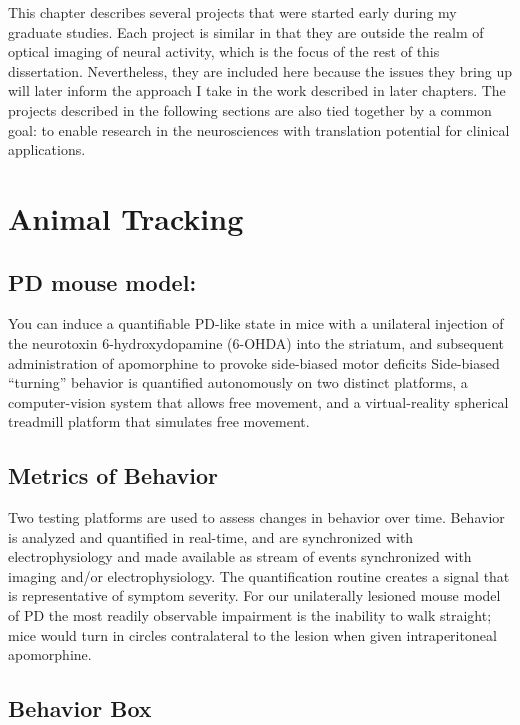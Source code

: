 \documentclass[../main.tex]{subfiles}
\begin{document}
\thispagestyle{myheadings}


This chapter describes several projects that were started early during my graduate studies.
Each project is similar in that they are outside the realm of optical imaging of neural activity, which is the focus of the rest of this dissertation.
Nevertheless, they are included here because the issues they bring up will later inform the approach I take in the work described in later chapters.
The projects described in the following sections are also tied together by a common goal: to enable research in the neurosciences with translation potential for clinical applications.

\section{
  Animal Tracking}\label{sec:animal-tracking}

\subsection{PD mouse model:}\label{sec:pd-mouse-model}

You can induce a quantifiable PD-like state in mice with a unilateral injection of the neurotoxin 6-hydroxydopamine (6-OHDA) into the striatum, and subsequent administration of apomorphine to provoke side-biased motor deficits \cite{iancu_behavioral_2005}
Side-biased ``turning'' behavior is quantified autonomously on two distinct platforms, a computer-vision system that allows free movement, and a virtual-reality spherical treadmill platform that simulates free movement.

\subsection{
	Metrics of Behavior}\label{sec:metrics-of-behavior}

Two testing platforms are used to assess changes in behavior over time.
Behavior is analyzed and quantified in real-time, and are synchronized with electrophysiology and made available as stream of events synchronized with imaging and/or electrophysiology.
The quantification routine creates a signal that is representative of symptom severity.
For our unilaterally lesioned mouse model of PD the most readily observable impairment is the inability to walk straight;
mice would turn in circles
contralateral to the lesion when given intraperitoneal apomorphine.

\subsection{
	Behavior Box}\label{sec:behavior-box}
\end{document}
